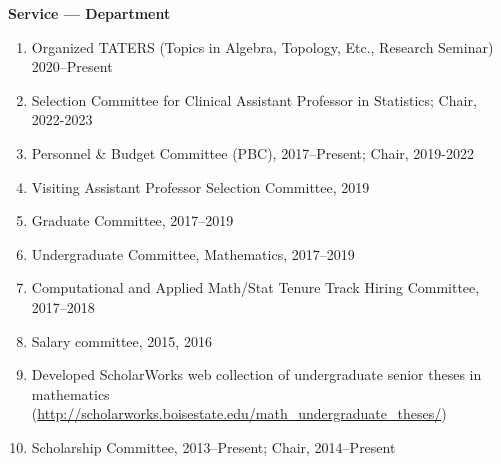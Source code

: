 \documentclass[12pt]{article}
\begin{document}
\textbf{Service --- Department}
\begin{enumerate}[revarabic,labelwidth=*]

\item Organized TATERS (Topics in Algebra, Topology, Etc., Research Seminar) 2020--Present

\item Selection Committee for Clinical Assistant Professor in Statistics; Chair, 2022-2023

\item Personnel \& Budget Committee (PBC), 2017--Present; Chair, 2019-2022

\item Visiting Assistant Professor Selection Committee, 2019

\item Graduate Committee, 2017--2019

\item Undergraduate Committee, Mathematics, 2017--2019

\item Computational and Applied Math/Stat Tenure Track Hiring Committee, 2017--2018

\item Salary committee, 2015, 2016

\item Developed ScholarWorks web collection of undergraduate senior theses in mathematics
(\url{http://scholarworks.boisestate.edu/math_undergraduate_theses/})


\item Scholarship Committee, 2013--Present; Chair, 2014--Present


\end{enumerate}
\end{document}
